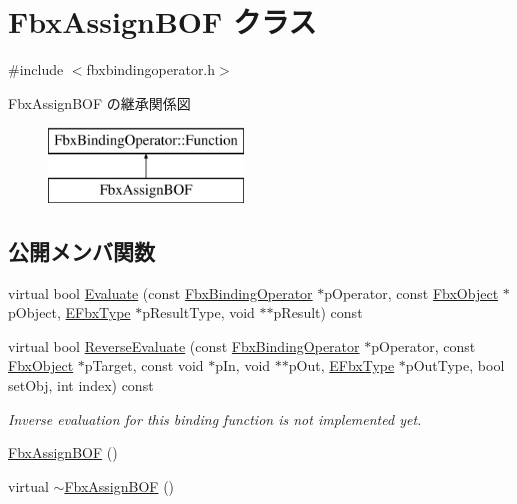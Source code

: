\hypertarget{class_fbx_assign_b_o_f}{}\section{Fbx\+Assign\+B\+OF クラス}
\label{class_fbx_assign_b_o_f}


{\ttfamily \#include $<$fbxbindingoperator.\+h$>$}

Fbx\+Assign\+B\+OF の継承関係図\begin{figure}[H]
\begin{center}
\leavevmode
\includegraphics[height=2.000000cm]{class_fbx_assign_b_o_f}
\end{center}
\end{figure}
\subsection*{公開メンバ関数}
\begin{DoxyCompactItemize}
\item 
virtual bool \hyperlink{class_fbx_assign_b_o_f_a8d560108ab481a3087cc6a997284617c}{Evaluate} (const \hyperlink{class_fbx_binding_operator}{Fbx\+Binding\+Operator} $\ast$p\+Operator, const \hyperlink{class_fbx_object}{Fbx\+Object} $\ast$p\+Object, \hyperlink{fbxpropertytypes_8h_a73913a5ddfb20e57c6f25e9e6784bd92}{E\+Fbx\+Type} $\ast$p\+Result\+Type, void $\ast$$\ast$p\+Result) const
\item 
virtual bool \hyperlink{class_fbx_assign_b_o_f_ae2342d6ad5f7bc8182cc14c562290247}{Reverse\+Evaluate} (const \hyperlink{class_fbx_binding_operator}{Fbx\+Binding\+Operator} $\ast$p\+Operator, const \hyperlink{class_fbx_object}{Fbx\+Object} $\ast$p\+Target, const void $\ast$p\+In, void $\ast$$\ast$p\+Out, \hyperlink{fbxpropertytypes_8h_a73913a5ddfb20e57c6f25e9e6784bd92}{E\+Fbx\+Type} $\ast$p\+Out\+Type, bool set\+Obj, int index) const
\begin{DoxyCompactList}\small\item\em Inverse evaluation for this binding function is not implemented yet. \end{DoxyCompactList}\item 
\hyperlink{class_fbx_assign_b_o_f_a4bc01f55fb7c8103bd2170ca033ec77b}{Fbx\+Assign\+B\+OF} ()
\item 
virtual \hyperlink{class_fbx_assign_b_o_f_ae9e45cfddb130ed0b5758c50be05f11d}{$\sim$\+Fbx\+Assign\+B\+OF} ()
\end{DoxyCompactItemize}
